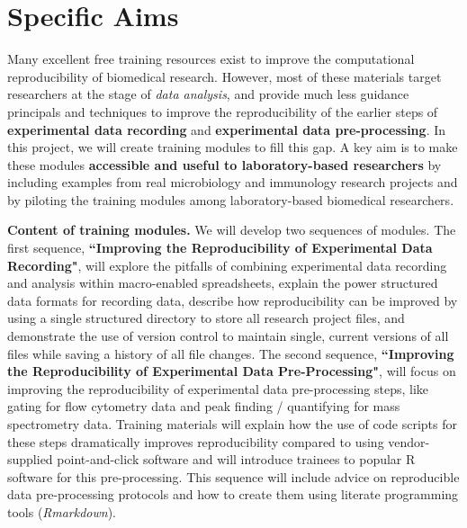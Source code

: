 \documentclass[pdftex,english,11pt,parskip=half]{scrartcl}
\begin{document}
\def\bf{\normalfont\bfseries}
\pagestyle{empty}

\section*{Specific Aims}
\begingroup
    \fontsize{11pt}{12pt}\selectfont 
    
Many excellent free training resources exist to improve the computational reproducibility of biomedical research. However, most of these materials target researchers at the stage of \textit{data analysis}, and provide much less guidance principals and techniques to improve the reproducibility of the earlier steps of \textbf{experimental data recording} and \textbf{experimental data pre-processing}. In this project, we will create training modules to fill this gap. A key aim is to make these modules \textbf{accessible and useful to laboratory-based researchers} by including examples from real microbiology and immunology research projects and by piloting the training modules among laboratory-based biomedical researchers.


\textbf{Content of training modules.} We will develop two sequences of modules. The first sequence, \textbf{``Improving the Reproducibility of Experimental Data Recording"}, will explore the pitfalls of combining experimental data recording and analysis within macro-enabled spreadsheets, explain the power structured data formats for recording data, describe how reproducibility can be improved by using a single structured directory to store all research project files, and demonstrate the use of version control to maintain single, current versions of all files while saving a history of all file changes. The second sequence, \textbf{``Improving the Reproducibility of Experimental Data Pre-Processing"}, will focus on improving the reproducibility of experimental data pre-processing steps, like gating for flow cytometry data and peak finding / quantifying for mass spectrometry data. Training materials will explain how the use of code scripts for these steps dramatically improves reproducibility compared to using vendor-supplied point-and-click software and will introduce trainees to popular R software for this pre-processing. This sequence will include advice on reproducible data pre-processing protocols and how to create them using literate programming tools (\textit{Rmarkdown}). 
\end{document}
